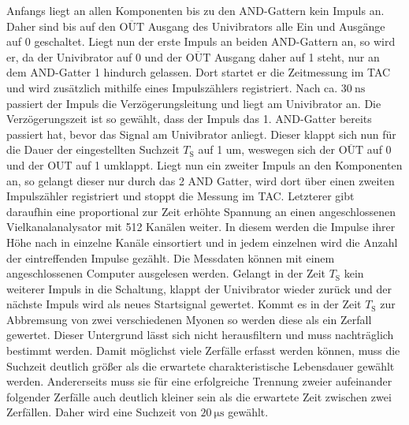     Anfangs liegt an allen Komponenten bis zu den AND-Gattern kein Impuls an. Daher sind bis auf den $\overline{\text{OUT}}$ Ausgang des Univibrators alle Ein und Ausgänge auf 0 geschaltet.
    Liegt nun der erste Impuls an beiden AND-Gattern an, so wird er, da der Univibrator auf 0 und der $\overline{\text{OUT}}$ Ausgang daher auf 1 steht, nur an dem AND-Gatter 1 hindurch gelassen. Dort startet er die Zeitmessung im TAC und wird zusätzlich mithilfe eines Impulszählers registriert. Nach ca. $\SI{30}{\nano\second}$ passiert der Impuls die Verzögerungsleitung und liegt am Univibrator an. Die Verzögerungszeit ist so gewählt, dass der Impuls das 1. AND-Gatter bereits passiert hat, bevor das Signal am Univibrator anliegt. Dieser klappt sich nun für die Dauer der eingestellten Suchzeit $T_\text{S}$ auf 1 um, weswegen sich der $\overline{\text{OUT}}$ auf 0 und der OUT auf 1 umklappt. Liegt nun ein zweiter Impuls an den Komponenten an, so gelangt dieser nur durch das 2 AND Gatter, wird dort über einen zweiten Impulszähler registriert und stoppt die Messung im TAC. Letzterer gibt daraufhin eine proportional zur Zeit erhöhte Spannung an einen angeschlossenen Vielkanalanalysator mit 512 Kanälen weiter. In diesem werden die Impulse ihrer Höhe nach in einzelne Kanäle einsortiert und in jedem einzelnen wird die Anzahl der eintreffenden Impulse gezählt. Die Messdaten können mit einem angeschlossenen Computer ausgelesen werden. Gelangt in der Zeit $T_\text{S}$ kein weiterer Impuls in die Schaltung, klappt der Univibrator wieder zurück und der nächste Impuls wird als neues Startsignal gewertet. Kommt es in der Zeit $T_\text{S}$ zur Abbremsung von zwei verschiedenen Myonen so werden diese als ein Zerfall gewertet. Dieser Untergrund lässt sich nicht herausfiltern und muss nachträglich bestimmt werden. Damit möglichst viele Zerfälle erfasst werden können, muss die Suchzeit deutlich größer als die erwartete charakteristische Lebensdauer gewählt werden. Andererseits muss sie für eine erfolgreiche Trennung zweier aufeinander folgender Zerfälle auch deutlich kleiner sein als die erwartete Zeit zwischen zwei Zerfällen. Daher wird eine Suchzeit von $\SI{20}{\micro\second}$ gewählt. 


